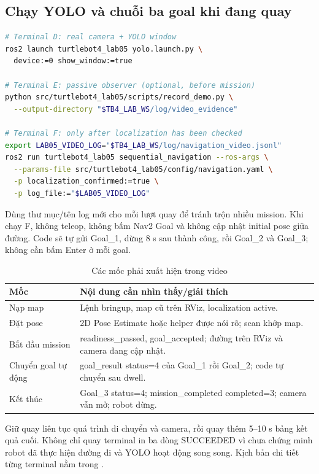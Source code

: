 \subsection{Chạy YOLO và chuỗi ba goal khi đang quay}
\begin{lstlisting}[language=bash,caption={Terminal D, E, F: nhận diện, observer và mission},label={lst:mission}]
# Terminal D: real camera + YOLO window
ros2 launch turtlebot4_lab05 yolo.launch.py \
  device:=0 show_window:=true

# Terminal E: passive observer (optional, before mission)
python src/turtlebot4_lab05/scripts/record_demo.py \
  --output-directory "$TB4_LAB_WS/log/video_evidence"

# Terminal F: only after localization has been checked
export LAB05_VIDEO_LOG="$TB4_LAB_WS/log/navigation_video.jsonl"
ros2 run turtlebot4_lab05 sequential_navigation --ros-args \
  --params-file src/turtlebot4_lab05/config/navigation.yaml \
  -p localization_confirmed:=true \
  -p log_file:="$LAB05_VIDEO_LOG"
\end{lstlisting}
Dùng thư mục/tên log mới cho mỗi lượt quay để tránh trộn nhiều mission. Khi chạy F, không teleop, không bấm Nav2 Goal và không cập nhật initial pose giữa đường. Code sẽ tự gửi Goal\_1, dừng 8 s sau thành công, rồi Goal\_2 và Goal\_3; không cần bấm Enter ở mỗi goal.
\begin{table}[H]\centering\small
\caption{Các mốc phải xuất hiện trong video}
\begin{tabularx}{\linewidth}{@{}P{3.8cm}Y@{}}\toprule
Mốc&Nội dung cần nhìn thấy/giải thích\\\midrule
Nạp map&Lệnh bringup, map cũ trên RViz, localization active.\\
Đặt pose&2D Pose Estimate hoặc helper được nói rõ; scan khớp map.\\
Bắt đầu mission&readiness\_passed, goal\_accepted; đường trên RViz và camera đang cập nhật.\\
Chuyển goal tự động&goal\_result status=4 của Goal\_1 rồi Goal\_2; code tự chuyển sau dwell.\\
Kết thúc&Goal\_3 status=4; mission\_completed completed=3; camera vẫn mở; robot dừng.\\\bottomrule
\end{tabularx}\end{table}
Giữ quay liên tục quá trình di chuyển và camera, rồi quay thêm 5--10 s bảng kết quả cuối. Không chỉ quay terminal in ba dòng SUCCEEDED vì chưa chứng minh robot đã thực hiện đường đi và YOLO hoạt động song song. Kịch bản chi tiết từng terminal nằm trong .

